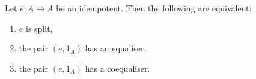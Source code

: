 Let $e\colon A\to A$ be an idempotent. Then the following are equivalent:
\begin{enumerate}[label=(\roman*)]
	\item $e$ is split,
	\item the pair $(e, 1_A)$ has an equaliser,
	\item the pair $(e, 1_A)$ has a coequaliser.
\end{enumerate}
